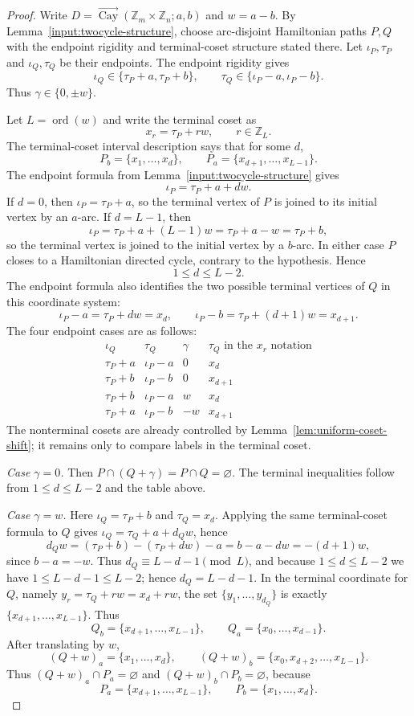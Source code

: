 \documentclass[11pt]{article}
\newcommand{\Cay}{\overrightarrow{\operatorname{Cay}}}
\newcommand{\Z}{\mathbb Z}
\newcommand{\ord}{\operatorname{ord}}
\begin{document}
\begin{proof}
Write $D=\Cay(\Z_m\times\Z_n;a,b)$ and $w=a-b$.  By Lemma~\ref{input:twocycle-structure}, choose arc-disjoint Hamiltonian paths $P,Q$ with the endpoint rigidity and terminal-coset structure stated there.  Let $\iota_P,\tau_P$ and $\iota_Q,\tau_Q$ be their endpoints.  The endpoint rigidity gives
\[
        \iota_Q\in\{\tau_P+a,\tau_P+b\},
        \qquad
        \tau_Q\in\{\iota_P-a,\iota_P-b\}.
\]
Thus $\gamma\in\{0,\pm w\}$.

Let $L=\ord(w)$ and write the terminal coset as
\[
        x_r=\tau_P+rw,
        \qquad r\in\Z_L.
\]
The terminal-coset interval description says that for some $d$,
\[
        P_b=\{x_1,\ldots,x_d\},
        \qquad
        P_a=\{x_{d+1},\ldots,x_{L-1}\}.
\]
The endpoint formula from Lemma~\ref{input:twocycle-structure} gives
\[
        \iota_P=\tau_P+a+dw.
\]
If $d=0$, then $\iota_P=\tau_P+a$, so the terminal vertex of $P$ is joined to its initial vertex by an $a$-arc.  If $d=L-1$, then
\[
        \iota_P=\tau_P+a+(L-1)w=\tau_P+a-w=\tau_P+b,
\]
so the terminal vertex is joined to the initial vertex by a $b$-arc.  In either case $P$ closes to a Hamiltonian directed cycle, contrary to the hypothesis.  Hence
\[
        1\le d\le L-2.
\]
The endpoint formula also identifies the two possible terminal vertices of $Q$ in this coordinate system:
\[
        \iota_P-a=\tau_P+dw=x_d,
        \qquad
        \iota_P-b=\tau_P+(d+1)w=x_{d+1}.
\]
The four endpoint cases are as follows:
\[
\begin{array}{c|c|c|c}
\iota_Q & \tau_Q & \gamma & \tau_Q \text{ in the }x_r\text{ notation}\\ \hline
\tau_P+a & \iota_P-a & 0 & x_d\\
\tau_P+b & \iota_P-b & 0 & x_{d+1}\\
\tau_P+b & \iota_P-a & w & x_d\\
\tau_P+a & \iota_P-b & -w & x_{d+1}
\end{array}
\]
The nonterminal cosets are already controlled by Lemma~\ref{lem:uniform-coset-shift}; it remains only to compare labels in the terminal coset.

\medskip
\noindent\emph{Case $\gamma=0$.}
Then $P\cap(Q+\gamma)=P\cap Q=\varnothing$.  The terminal inequalities follow from $1\le d\le L-2$ and the table above.

\medskip
\noindent\emph{Case $\gamma=w$.}
Here $\iota_Q=\tau_P+b$ and $\tau_Q=x_d$.  Applying the same terminal-coset formula to $Q$ gives $\iota_Q=\tau_Q+a+d_Qw$, hence
\[
        d_Qw=(\tau_P+b)-(\tau_P+dw)-a
        =b-a-dw=-(d+1)w,
\]
since $b-a=-w$.  Thus $d_Q\equiv L-d-1\pmod L$, and because $1\le d\le L-2$ we have $1\le L-d-1\le L-2$; hence $d_Q=L-d-1$.  In the terminal coordinate for $Q$, namely $y_r=\tau_Q+rw=x_d+rw$, the set $\{y_1,\ldots,y_{d_Q}\}$ is exactly $\{x_{d+1},\ldots,x_{L-1}\}$.  Thus
\[
        Q_b=\{x_{d+1},\ldots,x_{L-1}\},
        \qquad
        Q_a=\{x_0,\ldots,x_{d-1}\}.
\]
After translating by $w$,
\[
        (Q+w)_a=\{x_1,\ldots,x_d\},
        \qquad
        (Q+w)_b=\{x_0,x_{d+2},\ldots,x_{L-1}\}.
\]
Thus $(Q+w)_a\cap P_a=\varnothing$ and $(Q+w)_b\cap P_b=\varnothing$, because
\[
        P_a=\{x_{d+1},\ldots,x_{L-1}\},
        \qquad
        P_b=\{x_1,\ldots,x_d\}.
\]


\end{proof}
\end{document}

